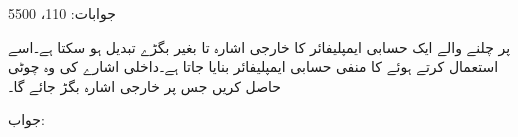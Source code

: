 جوابات: 110،  5500

 پر چلنے والے ایک حسابی ایمپلیفائر کا خارجی اشارہ  تا   بغیر بگڑے تبدیل ہو سکتا ہے۔اسے استعمال کرتے ہوئے  کا منفی حسابی ایمپلیفائر بنایا جاتا ہے۔داخلی اشارے کی وہ چوٹی  حاصل کریں جس پر خارجی اشارہ بگڑ جائے گا۔

جواب: 

